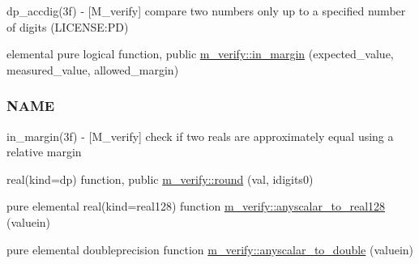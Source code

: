 \begin{DoxyCompactItemize}
\begin{DoxyCompactList}
dp\+\_\+accdig(3f) -\/ \mbox{[}M\+\_\+verify\mbox{]} compare two numbers only up to a specified number of digits (L\+I\+C\+E\+N\+SE\+:PD) \end{DoxyCompactList}\item 
elemental pure logical function, public \mbox{\hyperlink{namespacem__verify_aa0d8de1c26ca3aae0366b9fb8ead21c4}{m\+\_\+verify\+::in\+\_\+margin}} (expected\+\_\+value, measured\+\_\+value, allowed\+\_\+margin)
\begin{DoxyCompactList}\small\item\em \subsubsection*{N\+A\+ME}

in\+\_\+margin(3f) -\/ \mbox{[}M\+\_\+verify\mbox{]} check if two reals are approximately equal using a relative margin \end{DoxyCompactList}\item 
real(kind=dp) function, public \mbox{\hyperlink{namespacem__verify_af997c802e1ad966d55f023822b2f645a}{m\+\_\+verify\+::round}} (val, idigits0)
\item 
pure elemental real(kind=real128) function \mbox{\hyperlink{namespacem__verify_ab08d7bdca3b5d5e99732919be5880dc4}{m\+\_\+verify\+::anyscalar\+\_\+to\+\_\+real128}} (valuein)
\item 
pure elemental doubleprecision function \mbox{\hyperlink{namespacem__verify_a92278514bcbb93fefca1d925e3dfba65}{m\+\_\+verify\+::anyscalar\+\_\+to\+\_\+double}} (valuein)
\end{DoxyCompactItemize}
